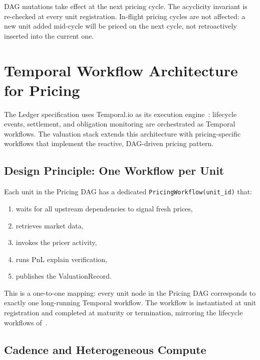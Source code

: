 \documentclass[11pt,a4paper]{article}
\begin{document}
\noindent DAG mutations take effect at the next pricing cycle.  The acyclicity invariant is re-checked at every unit registration.  In-flight pricing cycles are not affected: a new unit added mid-cycle will be priced on the next cycle, not retroactively inserted into the current one.

\clearpage
\section{Temporal Workflow Architecture for Pricing}
\label{sec:temporal}

The Ledger specification uses Temporal.io as its execution engine~\cite[\S14]{ledger}: lifecycle events, settlement, and obligation monitoring are orchestrated as Temporal workflows.  The valuation stack extends this architecture with pricing-specific workflows that implement the reactive, DAG-driven pricing pattern.

\subsection{Design Principle: One Workflow per Unit}

Each unit in the Pricing DAG has a dedicated \texttt{PricingWorkflow(unit\_id)} that:
\begin{enumerate}[nosep]
\item waits for all upstream dependencies to signal fresh prices,
\item retrieves market data,
\item invokes the pricer activity,
\item runs PnL explain verification,
\item publishes the ValuationRecord.
\end{enumerate}

This is a one-to-one mapping: every unit node in the Pricing DAG corresponds to exactly one long-running Temporal workflow.  The workflow is instantiated at unit registration and completed at maturity or termination, mirroring the lifecycle workflows of~\cite[\S14.4]{ledger}.

\subsection{Cadence and Heterogeneous Compute}
\end{document}
